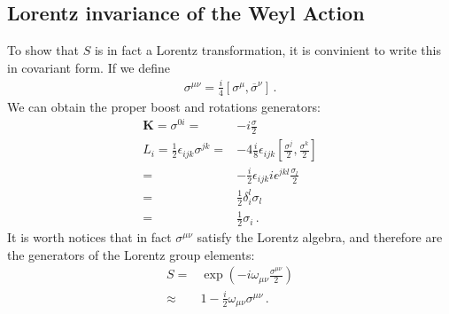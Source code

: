\subsection{Lorentz invariance of the Weyl Action}

\begin{frame}
To show that $S$ is in fact a Lorentz transformation, it is convinient to write this in covariant form. If we define
\begin{align}
  \sigma^{\mu\nu}=\frac{i}{4}\left[\sigma^\mu,\overline{\sigma}^\nu\right]\,.
\end{align}
We can obtain the proper boost and rotations generators:
\begin{align*}
 \mathbf{K}= \sigma^{0i}=&-i\frac{\sigma}{2}\nonumber\\
 L_{i}=\frac{1}{2}\epsilon_{ijk}\sigma^{jk}=&-4\frac{i}{8}\epsilon_{ijk}\left[\frac{\sigma^j}{2},\frac{\sigma^k}{2}  \right]\nonumber\\
=&-\tfrac{i}{2}\epsilon_{ijk}i\epsilon^{jkl}\frac{\sigma_l}{2}\nonumber\\
=&\tfrac{1}{2}\delta_i^l\sigma_l\nonumber\\
=&\tfrac{1}{2}\sigma_i\,.
\end{align*}
It is worth notices that in fact $\sigma^{\mu\nu}$ satisfy the Lorentz algebra, and therefore are the generators of the Lorentz group elements:
\begin{align}
  S=&\exp\left(-i \omega_{\mu\nu}\frac{\sigma^{\mu\nu}}{2}\right)\nonumber\\
  \approx&1-\frac{i}{2} \omega_{\mu\nu}{\sigma^{\mu\nu}}\,.
\end{align}



\end{frame}
